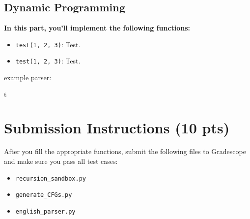 \documentclass{article}
\begin{document}
\subsection*{Dynamic Programming}



\begin{tcolorbox}[enhanced,interior style={top color=Dandelion!20,bottom color=Dandelion!30}]
    \textbf{In this part, you'll implement the following functions:}
    \begin{itemize}
        \item \lstinline{test(1, 2, 3)}: Test.
        \item \lstinline{test(1, 2, 3)}: Test.
    \end{itemize}
\end{tcolorbox}







example parser:





t
\section*{Submission Instructions (10 pts)}
    After you fill the appropriate functions, submit the following files to Gradescope and make sure you pass all test cases:
    \begin{itemize}
        \item \lstinline{recursion_sandbox.py}
        \item \lstinline{generate_CFGs.py}
        \item \lstinline{english_parser.py}
    \end{itemize}
\end{document}
